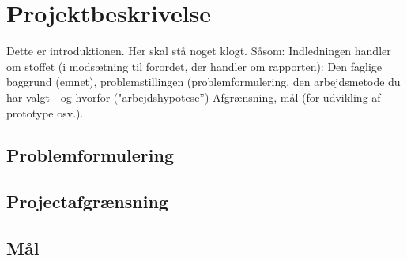 \chapter{Projektbeskrivelse}
Dette er introduktionen. Her skal stå noget klogt. Såsom: Indledningen handler om stoffet (i modsætning til forordet, der handler om rapporten): Den faglige baggrund (emnet), problemstillingen (problemformulering, den arbejdsmetode du har valgt - og hvorfor ("arbejdshypotese”) Afgrænsning, mål (for udvikling af prototype osv.).

\newpage

\section{Problemformulering}
\lipsum[3]

\section{Projectafgrænsning}
\lipsum[3]

\section{Mål}
\lipsum[3]
